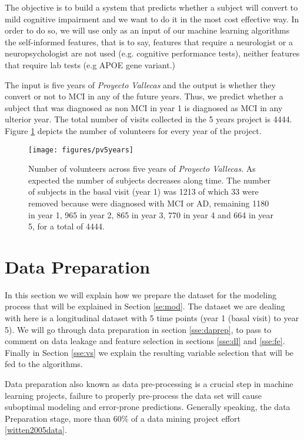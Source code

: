 \documentclass[11pt]{article}
\begin{document}
The objective is to build a system that predicts whether a subject will convert to mild cognitive impairment and we want to do it in the most cost effective way. In order to do so, we will use only as an input of our machine learning algorithms the self-informed features, that is to say, features that require a neurologist or a neuropsychologist are not used (e.g. cognitive performance tests), neither features that require lab tests (e.g APOE gene variant.)

The input is five years of \emph{Proyecto Vallecas} and the output is whether they convert or not to MCI in any of the future years. Thus, we predict whether a subject that was diagnosed as non MCI in year 1 is diagnosed as MCI in any ulterior year. The total number of visits collected in the 5 years project is 4444. Figure \ref{fig:pv5years} depicts the number of volunteers for every year of the project.

\begin{figure}[h!]
        \centering
        \texttt{[image: figures/pv5years]}
        \caption{Number of volunteers across five years of \emph{Proyecto Vallecas}. As expected the number of subjects decreases along time. The number of subjects in the basal visit (year 1) was 1213 of which 33 were removed  because were diagnosed with MCI or AD, remaining 1180 in year 1, 965 in year 2, 865 in year 3, 770 in year 4 and  664 in year 5, for a total of 4444.}
\label{fig:pv5years}
\end{figure}


\section{Data Preparation} 
\label{se:dp}
In this section we will explain how we prepare the dataset for the modeling process that will be explained in Section \ref{se:mod}.  
The dataset we are dealing with here is a longitudinal dataset with 5 time points (year 1 (basal visit) to year 5).
We will go through data preparation in section \ref{sse:daprep}, to pass to comment on data leakage and feature selection in sections \ref{sse:dl} and \ref{sse:fe}. Finally in Section \ref{sse:vs} we explain the resulting variable selection that will be fed to the algorithms.

Data preparation also known as data pre-processing is a crucial step in machine learning projects, failure to properly pre-process the data set will cause suboptimal modeling and error-prone predictions.
Generally speaking, the data Preparation stage, more than $60\%$ of a data mining project effort \ref{witten2005data}.
\end{document}
